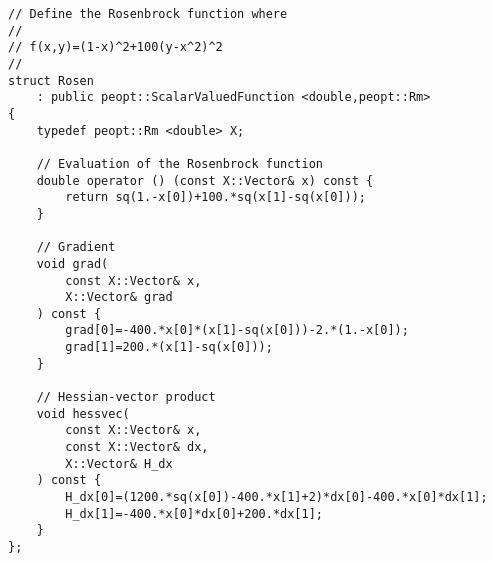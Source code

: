 \begin{lstlisting}[style=C++]
// Define the Rosenbrock function where
// 
// f(x,y)=(1-x)^2+100(y-x^2)^2
//
struct Rosen
    : public peopt::ScalarValuedFunction <double,peopt::Rm>
{
    typedef peopt::Rm <double> X;

    // Evaluation of the Rosenbrock function
    double operator () (const X::Vector& x) const {
        return sq(1.-x[0])+100.*sq(x[1]-sq(x[0]));
    }

    // Gradient
    void grad(
        const X::Vector& x,
        X::Vector& grad
    ) const {
        grad[0]=-400.*x[0]*(x[1]-sq(x[0]))-2.*(1.-x[0]);
        grad[1]=200.*(x[1]-sq(x[0]));
    }

    // Hessian-vector product
    void hessvec(
        const X::Vector& x,
        const X::Vector& dx,
        X::Vector& H_dx
    ) const {
        H_dx[0]=(1200.*sq(x[0])-400.*x[1]+2)*dx[0]-400.*x[0]*dx[1];
        H_dx[1]=-400.*x[0]*dx[0]+200.*dx[1];
    }
};
\end{lstlisting}
